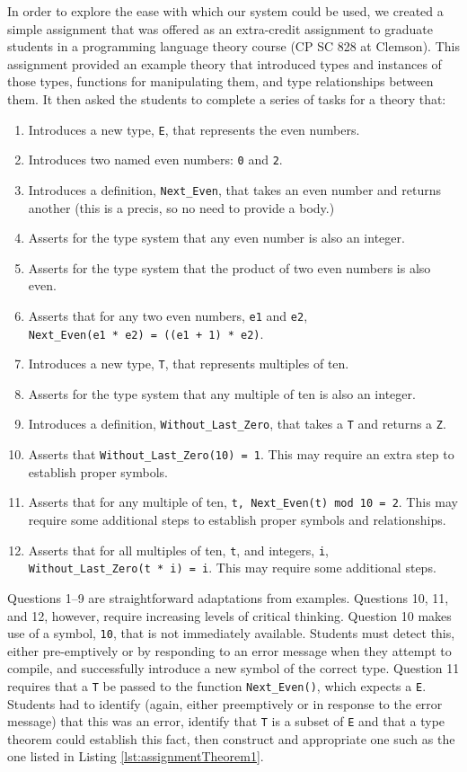 In order to explore the ease with which our system could be used, we created a simple assignment that was offered as an extra-credit assignment to graduate students in a programming language theory course (CP SC 828 at Clemson).  This assignment provided an example theory that introduced types and instances of those types, functions for manipulating them, and type relationships between them.  It then asked the students to complete a series of tasks for a theory that:

\begin{enumerate}
	\item Introduces a new type, \texttt{E}, that represents the even numbers.
	\item Introduces two named even numbers: \texttt{0} and \texttt{2}.
	\item Introduces a definition, \texttt{Next\_Even}, that takes an even number and returns another (this is a precis, so no need to provide a body.)
	\item Asserts for the type system that any even number is also an integer.
	\item Asserts for the type system that the product of two even numbers is also even.
	\item Asserts that for any two even numbers, \texttt{e1} and \texttt{e2}, \texttt{Next\_Even(e1~*~e2)~=~((e1~+~1)~*~e2)}.
	\item Introduces a new type, \texttt{T}, that represents multiples of ten.
	\item Asserts for the type system that any multiple of ten is also an integer.
	\item Introduces a definition, \texttt{Without\_Last\_Zero}, that takes a \texttt{T} and returns a \texttt{Z}.
	\item Asserts that \texttt{Without\_Last\_Zero(10)~=~1}.  This may require an extra step to establish proper symbols.
	\item Asserts that for any multiple of ten, \texttt{t,~Next\_Even(t)~mod~10~=~2}.  This may require some additional steps to establish proper symbols and relationships.
	\item Asserts that for all multiples of ten, \texttt{t}, and integers, \texttt{i}, \texttt{Without\_Last\_Zero(t~*~i)~=~i}.  This may require some additional steps.
\end{enumerate}

Questions 1--9 are straightforward adaptations from examples.  Questions 10, 11, and 12, however, require increasing levels of critical thinking.  Question 10 makes use of a symbol, \texttt{10}, that is not immediately available.  Students must detect this, either pre-emptively or by responding to an error message when they attempt to compile, and successfully introduce a new symbol of the correct type.  Question 11 requires that a \texttt{T} be passed to the function \texttt{Next\_Even()}, which expects a \texttt{E}.  Students had to identify (again, either preemptively or in response to the error message) that this was an error, identify that \texttt{T} is a subset of \texttt{E} and that a type theorem could establish this fact, then construct and appropriate one such as the one listed in Listing \ref{lst:assignmentTheorem1}.

